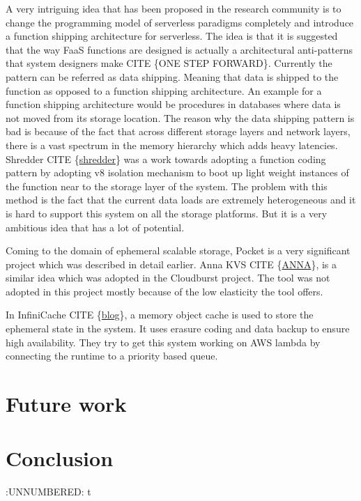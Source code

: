 \documentclass[12pt,titlepage]{article}
\begin{document}
A very intriguing idea that has been proposed in the research community is to
change the programming model of serverless paradigms completely and introduce a
function shipping architecture for serverless. The idea is that it is suggested
that the way FaaS functions are designed is actually a architectural
anti-patterns that system designers make CITE \{ONE STEP FORWARD\}. Currently the
pattern can be referred as data shipping. Meaning that data is shipped to the
function as opposed to a function shipping architecture. An example for a
function shipping architecture would be procedures in databases where data is
not moved from its storage location. The reason why the data shipping pattern is
bad is because of the fact that across different storage layers and network
layers, there is a vast spectrum in the memory hierarchy which adds heavy
latencies. Shredder CITE \{\href{https://www.cs.utah.edu/\~dongx/paper/sandstorm-socc.pdf}{shredder}\} was a work towards adopting a function
coding pattern by adopting v8 isolation mechanism to boot up light weight
instances of the function near to the storage layer of the system. The problem
with this method is the fact that the current data loads are extremely
heterogeneous and it is hard to support this system on all the storage
platforms. But it is a very ambitious idea that has a lot of potential.

Coming to the domain of ephemeral scalable storage, Pocket is a very significant
project which was described in detail earlier. Anna KVS CITE \{\href{https://dsf.berkeley.edu/jmh/papers/anna\_ieee18.pdf}{ANNA}\}, is a
similar idea which was adopted in the Cloudburst project. The tool was not
adopted in this project mostly because of the low elasticity the tool offers.


In InfiniCache CITE \{\href{https://www.usenix.org/conference/fast20/presentation/wang-ao}{blog}\}, a memory object cache is used to store the ephemeral
state in the system. It uses erasure coding and data backup to ensure high availability. 
They try to get this system working on AWS lambda by connecting the runtime to a
priority based queue. 

\section{Future work}
\label{sec:org0286d7d}
\section{Conclusion}
\label{sec:orgfe16837}


:UNNUMBERED: t
\end{document}
